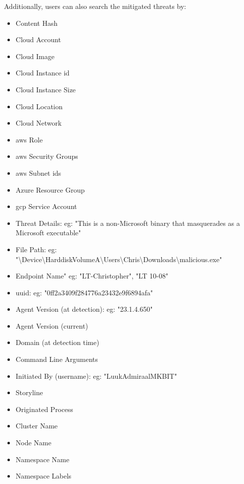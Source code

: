 \begin{multicols}{2}
      Additionally, users can also search the mitigated threats by:
      \begin{itemize}
            \item Content Hash
            \item Cloud Account
            \item Cloud Image
            \item Cloud Instance \acrshort{id}
            \item Cloud Instance Size
            \item Cloud Location
            \item Cloud Network
            \item \acrshort{aws} Role
            \item \acrshort{aws} Security Groups
            \item \acrshort{aws} Subnet \acrshort{id}s
            \item Azure Resource Group
            \item \acrshort{gcp} Service Account
            \item Threat Details: \acrshort{eg}: "This is a non-Microsoft binary that masquerades as a Microsoft executable"
            \item File Path: \acrshort{eg}: "\textbackslash Device\textbackslash HarddiskVolumeA\textbackslash Users\textbackslash Chris\textbackslash Downloads\textbackslash malicious.exe"
            \item Endpoint Name" \acrshort{eg}: "LT-Christopher", "LT 10-08"
            \item \acrshort{uuid}: \acrshort{eg}: "0ff2a3409f284776a23432e9f6894afa"
            \item Agent Version (at detection): \acrshort{eg}: "23.1.4.650"
            \item Agent Version (current)
            \item Domain (at detection time)
            \item Command Line Arguments
            \item Initiated By (username): \acrshort{eg}: "LuukAdmiraalMKBIT"
            \item Storyline
            \item Originated Process
            \item Cluster Name
            \item Node Name
            \item Namespace Name
            \item Namespace Labels

\end{itemize}
\end{multicols}
